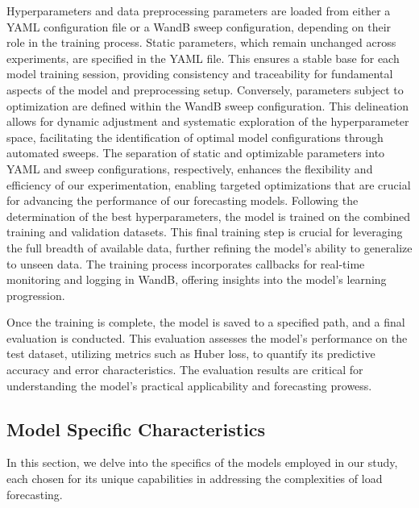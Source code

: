 \documentclass{article} %
\begin{document}
Hyperparameters and data preprocessing parameters are loaded from either a YAML configuration file or a \gls{WandB} sweep configuration, depending on their role in the training process. Static parameters, which remain unchanged across experiments, are specified in the YAML file. This ensures a stable base for each model training session, providing consistency and traceability for fundamental aspects of the model and preprocessing setup. Conversely, parameters subject to optimization are defined within the \gls{WandB} sweep configuration. This delineation allows for dynamic adjustment and systematic exploration of the hyperparameter space, facilitating the identification of optimal model configurations through automated sweeps. The separation of static and optimizable parameters into YAML and sweep configurations, respectively, enhances the flexibility and efficiency of our experimentation, enabling targeted optimizations that are crucial for advancing the performance of our forecasting models. 
Following the determination of the best hyperparameters, the model is trained on the combined training and validation datasets. This final training step is crucial for leveraging the full breadth of available data, further refining the model's ability to generalize to unseen data. The training process incorporates callbacks for real-time monitoring and logging in \gls{WandB}, offering insights into the model's learning progression. 

Once the training is complete, the model is saved to a specified path, and a final evaluation is conducted. This evaluation assesses the model's performance on the test dataset, utilizing metrics such as Huber loss, to quantify its predictive accuracy and error characteristics. The evaluation results are critical for understanding the model's practical applicability and forecasting prowess. 

\subsection{Model Specific Characteristics}

In this section, we delve into the specifics of the models employed in our study, each chosen for its unique capabilities in addressing the complexities of load forecasting. 
\end{document}
